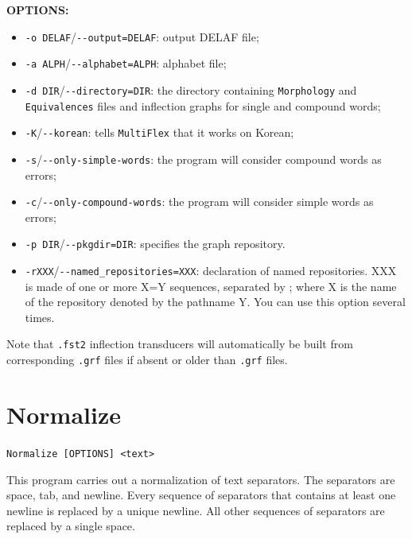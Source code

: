 \bigskip
\noindent \textbf{OPTIONS:}
\begin{itemize}
  \item \verb+-o DELAF+/\verb+--output=DELAF+: output DELAF file;
  \item \verb+-a ALPH+/\verb+--alphabet=ALPH+: alphabet file;
  \item \verb+-d DIR+/\verb+--directory=DIR+: the directory containing
  \verb+Morphology+ and \verb+Equivalences+ files and inflection graphs for
                                              single and compound words;
  \item \verb+-K+/\verb+--korean+: tells \verb+MultiFlex+ that it works on
  Korean;
  \item \verb+-s+/\verb+--only-simple-words+: the program will consider
  compound words as errors;
  \item \verb+-c+/\verb+--only-compound-words+: the program will consider
  simple words as errors;
  \item \verb+-p DIR+/\verb+--pkgdir=DIR+: specifies the graph repository.
  \item \verb+-rXXX+/\verb+--named_repositories=XXX+: declaration of named
  repositories. XXX is made of one or more X=Y sequences, separated by ; 
  where X is the name of the repository denoted by the pathname Y. You 
  can use this option several times.
  
\end{itemize}

\bigskip
\noindent Note that \verb+.fst2+ inflection transducers will automatically be
built from corresponding \verb+.grf+ files if absent or older than \verb+.grf+
files.







\section{Normalize}
\label{section-Normalize}
\verb+Normalize [OPTIONS] <text>+

\bigskip
\noindent {}This 
program carries out a normalization of text separators. The separators are
space, tab, and newline. Every sequence of separators that contains at least one
newline is replaced by a unique newline. All other sequences of separators are
replaced by a single space.

